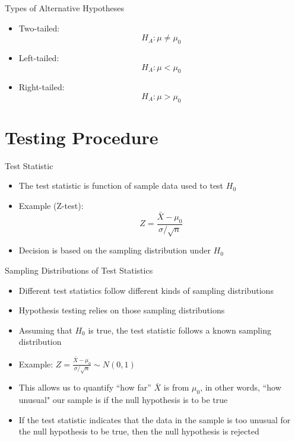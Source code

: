\documentclass[12pt, aspectratio=169]{beamer}
\begin{document}
    \begin{frame}{Types of Alternative Hypotheses}
        \begin{itemize}
            \item Two-tailed:
            \[
            H_A: \mu \neq \mu_0
            \]
            \item Left-tailed:
            \[
            H_A: \mu < \mu_0
            \]
            \item Right-tailed:
            \[
            H_A: \mu > \mu_0
            \]
        \end{itemize}
    \end{frame}


    \section{Testing Procedure}

    \begin{frame}{Test Statistic}
        \begin{itemize}
            \item The test statistic is function of sample data used to test $H_0$
            \item Example (Z-test):
            \[
            Z = \frac{\bar{X} - \mu_0}{\sigma/\sqrt{n}}
            \]
            \item Decision is based on the sampling distribution under $H_0$
        \end{itemize}
    \end{frame}


    \begin{frame}{Sampling Distributions of Test Statistics}
        \begin{itemize}
            \item Different test statistics follow different kinds of sampling distributions
            \item Hypothesis testing relies on those sampling distributions
            \item Assuming that $H_0$ is true, the test statistic follows a known sampling distribution
            \item Example: \(Z = \frac{\bar{X} - \mu_0}{\sigma/\sqrt{n}} \sim N(0,1)\)
            \item This allows us to quantify ``how far'' \(\bar{X}\) is from \(\mu_0\), in other words, ``how unusual" our sample is if the null hypothesis is to be true
            \item If the test statistic indicates that the data in the sample is too unusual for the null hypothesis to be true, then the null hypothesis is rejected
        \end{itemize}
    \end{frame}
\end{document}
